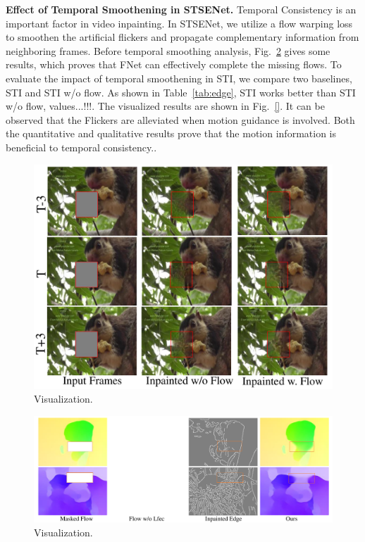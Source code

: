 \noindent \textbf{Effect of Temporal Smoothening in STSENet.}
Temporal Consistency is an important factor in video inpainting. In STSENet, we utilize a flow warping loss to smoothen the artificial flickers and propagate complementary information from neighboring frames. 
Before temporal smoothing analysis, Fig.~\ref{flowvis} gives some results, which proves that FNet can effectively complete the missing flows.
To evaluate the impact of temporal smoothening in STI, we compare two baselines, STI and STI w/o flow.
As shown in Table~\ref{tab:edge}, STI works better than STI w/o flow, values...!!!.
The visualized results are shown in Fig.~\ref{}.
It can be observed that the Flickers are alleviated when motion guidance is involved. 
Both the quantitative and qualitative results prove that the motion information is beneficial to temporal consistency..


\begin{figure}[t]
	\centering
	\includegraphics[width=1.0\columnwidth]{flow_vis} %
	\caption{Visualization.}
	\label{flow_vis}
\end{figure}



\begin{figure}[t]
	\centering
	\includegraphics[width=1.0\columnwidth]{flowvis} %
	\caption{Visualization.}
	\label{flowvis}
\end{figure}

